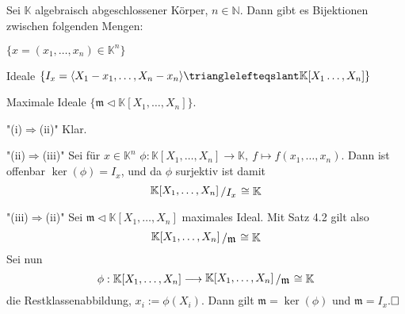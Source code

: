 \documentclass[11pt]{book}
\theoremstyle{nonumberbreak}
\newenvironment{pr}[1][]{\ifthenelse{\equal{#1}{}}{\proof}{\proof[#1]}\rm}{\endproof}
\newenvironment{folg}[1][]{\ifthenelse{\equal{#1}{}}{\folger}{\folger[#1]}\rm}{\endfolger}
\newcommand{\slant}[2]{{\raisebox{.1em}{$#1$}\left/\raisebox{-.1em}{$#2$}\right.}}
\begin{document}
\begin{spacing}{1.3}
\begin{folg} %
Sei $\mathbb{K}$ algebraisch abgeschlossener Körper, $n \in \mathbb{N}$. Dann gibt es Bijektionen zwischen folgenden Mengen:
\begin{compactenum}
\item $\{x=(x_1, \ldots, x_n) \in \mathbb{K}^n \}$
\item Ideale $\{I_x=\langle X_1-x_1, \ldots, X_n - x_n \rangle \trianglelefteqslant \mathbb{K}[X_1 \ldots, X_n]\}$
\item Maximale Ideale $\{\mathfrak{m}\triangleleft \mathbb{K}[X_1, \ldots, X_n]\}$.
\end{compactenum}
\begin{pr}
\begin{compactenum}
\item["(i)$\Rightarrow$(ii)"] Klar.
\item["(ii)$\Rightarrow$(iii)"] Sei für $x \in \mathbb{K}^n$ $\phi: \mathbb{K}[X_1, \ldots, X_n] \longrightarrow \mathbb{K}, \ f \mapsto f(x_1, \ldots, x_n)$. Dann ist offenbar $\ker(\phi)=I_x$, und da $\phi$ surjektiv ist damit
$$\slant{\mathbb{K}[X_1, \ldots, X_n]}{I_x} \cong \mathbb{K}$$
\item["(iii)$\Rightarrow$(ii)"] Sei $\mathfrak{m}\triangleleft \mathbb{K}[X_1, \ldots, X_n]$ maximales Ideal. Mit Satz 4.2 gilt also
$$\slant{\mathbb{K}[X_1, \ldots, X_n]}{\mathfrak{m}} \cong \mathbb{K}$$
Sei nun $$\phi: \mathbb{K}[X_1, \ldots, X_n] \longrightarrow \slant{\mathbb{K}[X_1, \ldots, X_n]}{\mathfrak{m}} \cong \mathbb{K}$$
die Restklassenabbildung, $x_i:=\phi(X_i)$. Dann gilt $\mathfrak{m}=\ker(\phi)$ und $\mathfrak{m}=I_x$.$\hfill \Box$
\end{compactenum}
\end{pr}
\end{folg}



\end{spacing}
\end{document}
